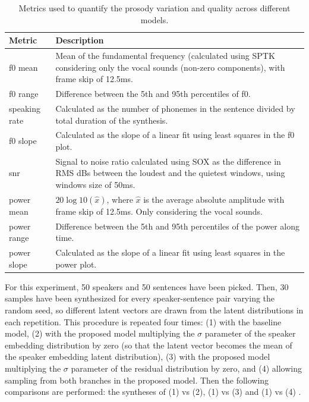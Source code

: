 \begin{table}
	\scriptsize
		\centering
	\caption{Metrics used to quantify the prosody variation and quality across different models.}
	\begin{tabular}{p{}|p{}}
		\toprule
		Metric & Description \\
		\midrule
		f0 mean &  Mean of the fundamental frequency (calculated using SPTK \autocite{sptk} considering only the vocal sounds (non-zero components), with frame skip of 12.5ms.\\
		f0 range & Difference between the 5th and 95th percentiles of f0. \\
		speaking rate & Calculated as the number of phonemes in the sentence divided by total duration of the synthesis. \\
		f0 slope & Calculated as the slope of a linear fit using least squares in the f0 plot. \\
		snr & Signal to noise ratio calculated using SOX \autocite{SOX} as the difference in RMS dBs between the loudest and the quietest windows, using windows size of 50ms. \\
		power mean & $20\log10(\hat{x})$, where $\hat{x}$ is the average absolute amplitude with frame skip of 12.5ms. Only considering the vocal sounds. \\
		power range & Difference between the 5th and 95th percentiles of the power along time. \\
		power slope & Calculated as the slope of a linear fit using least squares in the power plot. \\
		\bottomrule
	\end{tabular}
	\label{tab:metrics}
\end{table}

For this experiment, 50 speakers and 50 sentences have been picked. Then, 30 samples have been synthesized for every speaker-sentence pair varying the random seed, so different latent vectors are drawn from the latent distributions in each repetition. This procedure is repeated four times: (1) with the baseline model, (2) with the proposed model multiplying the $\sigma$ parameter of the speaker embedding distribution by zero (so that the latent vector becomes the mean of the speaker embedding latent distribution), (3) with the proposed model multiplying the $\sigma$ parameter of the residual distribution by zero, and (4) allowing sampling from both branches in the proposed model. Then the following comparisons are performed: the syntheses of (1) vs (2), (1) vs (3) and (1) vs (4) .

